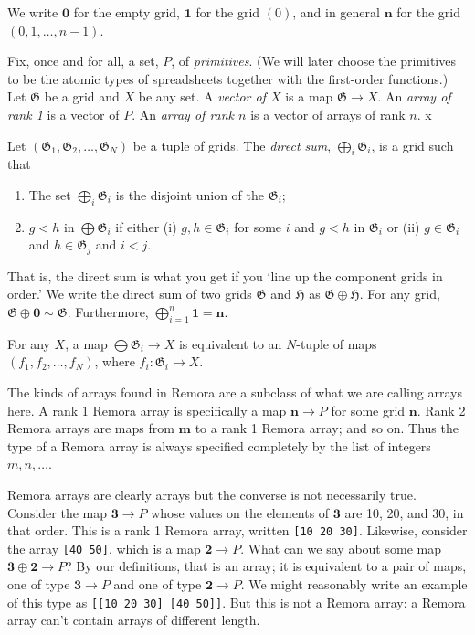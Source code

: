 \documentclass[11pt]{article}
\newcommand{\gr}[1]{\mathfrak{#1}}
\newcommand{\GG}{\gr{G}}
\newcommand{\void}{\mathbf{0}}
\begin{document}
We write \(\void\) for the empty grid, \(\mathbf{1}\) for the grid \((0)\), and in
general \(\mathbf{n}\) for the grid \((0, 1, \dotsc, n-1)\). 

Fix, once and for all, a set, \(P\), of \emph{primitives}. (We will later choose
the primitives to be the atomic types of spreadsheets together with the
first-order functions.) Let $\GG$ be a grid and $X$ be any set. A \emph{vector
of $X$} is a map $\GG \to X$. An \emph{array of rank 1} is a vector of $P$. An
\emph{array of rank $n$} is a vector of arrays of rank $n$. x

Let \((\GG_1, \GG_2, \dots, \GG_N)\) be a tuple of grids. The \emph{direct sum},
\(\bigoplus_i \GG_i\), is a grid such that
\begin{enumerate}
\item The set \(\bigoplus_i \GG_i\) is the disjoint union of the \(\GG_i\);
\item \(g<h\) in \(\bigoplus \GG_i\) if either (i) \(g, h\in \GG_i\) for some \(i\) and \(g<h\)
in \(\GG_i\) or (ii) \(g\in\GG_i\) and \(h\in\GG_j\) and \(i < j\).
\end{enumerate}
That is, the direct sum is what you get if you `line up the component grids in
order.' We write the direct sum of two grids \(\gr{G}\) and \(\gr{H}\) as \(\gr{G}\oplus
\gr{H}\). For any grid, \(\GG\oplus\void \sim \GG\). Furthermore,
\(\bigoplus_{i=1}^n \mathbf{1} = \mathbf{n}\). 

For any \(X\), a map \(\bigoplus \GG_i\to X\) is equivalent to an \(N\)-tuple of maps \((f_1, f_2,
\dots, f_N)\), where \(f_i : \GG_i\to X\).

The kinds of arrays found in Remora are a subclass of what we are calling arrays
here. A rank 1 Remora array is specifically a map \(\mathbf{n}\to P\) for some
grid \(\mathbf{n}\). Rank 2 Remora arrays are maps from \(\mathbf{m}\) to a rank 1
Remora array; and so on. Thus the type of a Remora array is always specified
completely by the list of integers \(m, n, \dotsc\).

Remora arrays are clearly arrays but the converse is not necessarily
true. Consider the map \(\mathbf{3}\to P\) whose values on the elements of
\(\mathbf{3}\) are 10, 20, and 30, in that order. This is a rank 1 Remora array,
written \texttt{[10 20 30]}. Likewise, consider the array \texttt{[40 50]}, which is a map
\(\mathbf{2}\to P\). What can we say about some map \(\mathbf{3}\oplus\mathbf{2}\to
P\)? By our definitions, that is an array; it is equivalent to a pair of maps,
one of type \(\mathbf{3}\to P\) and one of type \(\mathbf{2}\to P\). We might
reasonably write an example of this type as \texttt{[[10 20 30] [40 50]]}. But this is
not a Remora array: a Remora array can't contain arrays of different length.
\end{document}
